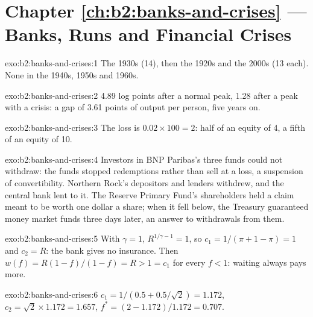 \section*{Chapter \ref{ch:b2:banks-and-crises} --- Banks, Runs and Financial Crises}

\begin{solution}{exo:b2:banks-and-crises:1}
The 1930s (14), then the 1920s and the 2000s (13 each). None in the 1940s, 1950s and 1960s.
\end{solution}

\begin{solution}{exo:b2:banks-and-crises:2}
4.89 log points after a normal peak, 1.28 after a peak with a crisis: a gap of 3.61 points of output per person, five years on.
\end{solution}

\begin{solution}{exo:b2:banks-and-crises:3}
The loss is $0.02 \times 100 = 2$: half of an equity of 4, a fifth of an equity of 10.
\end{solution}

\begin{solution}{exo:b2:banks-and-crises:4}
Investors in BNP Paribas's three funds could not withdraw: the funds stopped redemptions rather than sell at a loss, a
suspension of convertibility. Northern Rock's depositors and lenders withdrew, and the central bank lent to it. The
Reserve Primary Fund's shareholders held a claim meant to be worth one dollar a share; when it fell below, the Treasury
guaranteed money market funds three days later, an answer to withdrawals from them.
\end{solution}

\begin{solution}{exo:b2:banks-and-crises:5}
With $\gamma = 1$, $R^{1/\gamma - 1} = 1$, so $c_1 = 1/(\pi + 1 - \pi) = 1$ and $c_2 = R$: the bank gives no insurance. Then
$w(f) = R(1 - f)/(1 - f) = R > 1 = c_1$ for every $f < 1$: waiting always pays more.
\end{solution}

\begin{solution}{exo:b2:banks-and-crises:6}
$c_1 = 1/(0.5 + 0.5/\sqrt2) = 1.172$, $c_2 = \sqrt2 \times 1.172 = 1.657$, $f^* = (2 - 1.172)/1.172 = 0.707$.
\end{solution}

